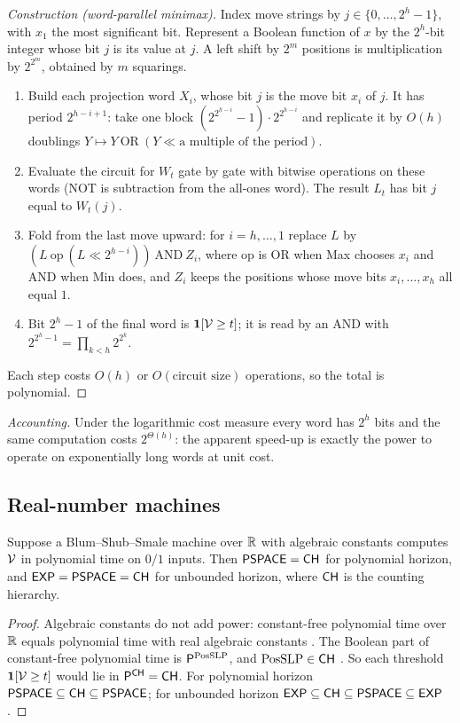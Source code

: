 \begin{proof}[Construction \textup{(word-parallel minimax)}]
Index move strings by $j\in\{0,\dots,2^h-1\}$, with $x_1$ the most significant bit. Represent a Boolean function of $x$ by the $2^h$-bit integer whose bit $j$ is its value at $j$. A left shift by $2^m$ positions is multiplication by $2^{2^m}$, obtained by $m$ squarings.
\begin{enumerate}[label=\arabic*.]
\item Build each projection word $X_i$, whose bit $j$ is the move bit $x_i$ of $j$. It has period $2^{h-i+1}$: take one block $(2^{2^{h-i}}-1)\cdot2^{2^{h-i}}$ and replicate it by $O(h)$ doublings $Y\mapsto Y\ \mathrm{OR}\ (Y\ll \text{a multiple of the period})$.
\item Evaluate the circuit for $W_t$ gate by gate with bitwise operations on these words (NOT is subtraction from the all-ones word). The result $L_t$ has bit $j$ equal to $W_t(j)$.
\item Fold from the last move upward: for $i=h,\dots,1$ replace $L$ by $(L\ \mathrm{op}\ (L\ll 2^{h-i}))\ \mathrm{AND}\ Z_i$, where op is OR when Max chooses $x_i$ and AND when Min does, and $Z_i$ keeps the positions whose move bits $x_i,\dots,x_h$ all equal $1$.
\item Bit $2^h-1$ of the final word is $\mathbf{1}[\mathcal{V}\ge t]$; it is read by an AND with $2^{2^h-1}=\prod_{k<h}2^{2^k}$.
\end{enumerate}
Each step costs $O(h)$ or $O(\text{circuit size})$ operations, so the total is polynomial.
\end{proof}

\noindent\emph{Accounting.} Under the logarithmic cost measure every word has $2^h$ bits and the same computation costs $2^{\Theta(h)}$: the apparent speed-up is exactly the power to operate on exponentially long words at unit cost.

\subsection{Real-number machines}
\begin{theorem}\label{thm:bss}
Suppose a Blum--Shub--Smale machine over $\mathbb{R}$ with algebraic constants computes $\mathcal{V}$ in polynomial time on $0/1$ inputs. Then $\mathsf{PSPACE}=\mathsf{CH}$ for polynomial horizon, and $\mathsf{EXP}=\mathsf{PSPACE}=\mathsf{CH}$ for unbounded horizon, where $\mathsf{CH}$ is the counting hierarchy.
\end{theorem}

\begin{proof}
Algebraic constants do not add power: constant-free polynomial time over $\mathbb{R}$ equals polynomial time with real algebraic constants \cite{ChapuisKoiran}. The Boolean part of constant-free polynomial time is $\mathsf{P}^{\mathrm{PosSLP}}$, and $\mathrm{PosSLP}\in\mathsf{CH}$ \cite{ABKM}. So each threshold $\mathbf{1}[\mathcal{V}\ge t]$ would lie in $\mathsf{P}^{\mathsf{CH}}=\mathsf{CH}$. For polynomial horizon $\mathsf{PSPACE}\subseteq\mathsf{CH}\subseteq\mathsf{PSPACE}$; for unbounded horizon $\mathsf{EXP}\subseteq\mathsf{CH}\subseteq\mathsf{PSPACE}\subseteq\mathsf{EXP}$.
\end{proof}

